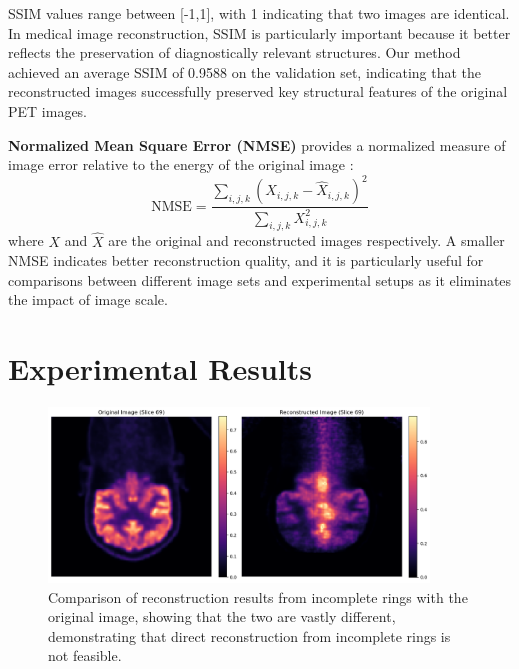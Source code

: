 \documentclass[
reprint,
superscriptaddress,
nofootinbib,
amsmath,amssymb,
aps,
prd,
]{revtex4-2}
\begin{document}
SSIM values range between [-1,1], with 1 indicating that two images are identical. In medical image reconstruction, SSIM is particularly important because it better reflects the preservation of diagnostically relevant structures. Our method achieved an average SSIM of 0.9588 on the validation set, indicating that the reconstructed images successfully preserved key structural features of the original PET images.

\textbf{Normalized Mean Square Error (NMSE)} provides a normalized measure of image error relative to the energy of the original image \cite{Higashiyama2024NMSE}:
\begin{equation}
\text{NMSE} = \frac{\sum_{i,j,k}(X_{i,j,k} - \hat{X}_{i,j,k})^2}{\sum_{i,j,k}X_{i,j,k}^2}
\end{equation}
where $X$ and $\hat{X}$ are the original and reconstructed images respectively. A smaller NMSE indicates better reconstruction quality, and it is particularly useful for comparisons between different image sets and experimental setups as it eliminates the impact of image scale.




\section{Experimental Results}

\label{chap:results}



\begin{figure}[htbp]
    \centering
    \vspace{-0.2cm}
    \includegraphics[width=0.9\textwidth]{Images/output2}
    \vspace{-0.2cm}
    \caption{Comparison of reconstruction results from incomplete rings with the original image, showing that the two are vastly different, demonstrating that direct reconstruction from incomplete rings is not feasible.}
    \vspace{-0.2cm}
    \label{fig:pet_incomplete_reconstruction}
\end{figure}
\end{document}
